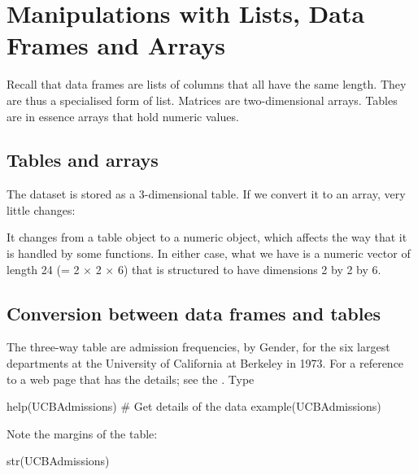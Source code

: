 \section{Manipulations with Lists, Data Frames and Arrays}

Recall that data frames are lists of columns that all have the
same length.  They are thus a specialised form of list.  Matrices
are two-dimensional arrays.  Tables are in essence arrays that
hold numeric values.

\subsection{Tables and arrays}
The dataset  is stored as a 3-dimensional
table.  If we convert it to an array, very little changes:

It changes from a table object to a numeric object, which
affects the way that it is handled by some functions.  In
either case, what we have is a numeric vector of length 24
(= 2 $\times$ 2 $\times$ 6) that is structured to have
dimensions 2 by 2 by 6.

\subsection{Conversion between data frames and tables}
The three-way table  are admission frequencies,
by Gender, for the six largest departments at the University of
California at Berkeley in 1973. For a reference to a web page that
has the details; see the .  Type
\begin{Schunk}
\begin{Sinput}
help(UCBAdmissions)     # Get details of the data
example(UCBAdmissions)
\end{Sinput}
\end{Schunk}
Note the margins of the table:
\begin{fullwidth}
\begin{Schunk}
\begin{Sinput}
str(UCBAdmissions)
\end{Sinput}
\end{Schunk}
\end{fullwidth}

